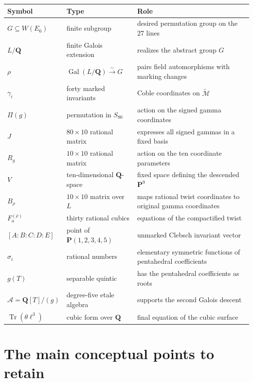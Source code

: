 \documentclass[11pt]{article}
\newcommand{\QQ}{\mathbf{Q}}
\newcommand{\PP}{\mathbf{P}}
\newcommand{\Gal}{\operatorname{Gal}}
\newcommand{\Tr}{\operatorname{Tr}}
\newcommand{\tcM}{\widetilde{\mathcal{M}}}
\newcommand{\cA}{\mathscr{A}}
\begin{document}
\begin{center}
\renewcommand{\arraystretch}{1.2}
\begin{tabular}{>{\raggedright\arraybackslash}p{}
                >{\raggedright\arraybackslash}p{}
                >{\raggedright\arraybackslash}p{}}
\toprule
Symbol & Type & Role \\
\midrule
$G\subseteq W(E_6)$ & finite subgroup & desired permutation group on the $27$ lines \\
$L/\QQ$ & finite Galois extension & realizes the abstract group $G$ \\
$\rho$ & $\Gal(L/\QQ)\xrightarrow{\sim}G$ & pairs field automorphisms with marking changes \\
$\gamma_i$ & forty marked invariants & Coble coordinates on $\tcM$ \\
$\Pi(g)$ & permutation in $S_{80}$ & action on the signed gamma coordinates \\
$J$ & $80\times10$ rational matrix & expresses all signed gammas in a fixed basis \\
$R_g$ & $10\times10$ rational matrix & action on the ten coordinate parameters \\
$V$ & ten-dimensional $\QQ$-space & fixed space defining the descended $\PP^9$ \\
$B_{\rho}$ & $10\times10$ matrix over $L$ & maps rational twist coordinates to original gamma coordinates \\
$F_a^{(\rho)}$ & thirty rational cubics & equations of the compactified twist \\
$[A:B:C:D:E]$ & point of $\PP(1,2,3,4,5)$ & unmarked Clebsch invariant vector \\
$\sigma_i$ & rational numbers & elementary symmetric functions of pentahedral coefficients \\
$g(T)$ & separable quintic & has the pentahedral coefficients as roots \\
$\cA=\QQ[T]/(g)$ & degree-five etale algebra & supports the second Galois descent \\
$\Tr(\theta\ell^3)$ & cubic form over $\QQ$ & final equation of the cubic surface \\
\bottomrule
\end{tabular}
\end{center}

\section{The main conceptual points to retain}
\end{document}
